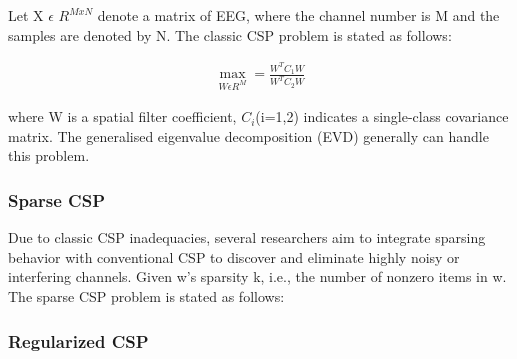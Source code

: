 \documentclass{Configuration_Files/PoliMi3i_thesis}
\begin{document}
Let X $\epsilon$ $R^{M x N}$ denote a matrix of EEG, where the channel number is M and the samples are denoted by N. The classic CSP problem is stated as follows:

\begin{align}
	\max_{W \epsilon R^{M}} = \frac{W^{T} C_1 W}{W^{T} C_2 W}
	\label{eq:CSP1}
\end{align}

where W is a spatial filter coefficient, $C_{i}$(i=1,2) indicates a single-class covariance matrix. The generalised eigenvalue decomposition (EVD) generally can handle this problem. \cite{abdullahEEGChannelSelection2022}

\subsubsection{Sparse CSP}

Due to classic CSP inadequacies, several researchers aim to integrate sparsing behavior with conventional CSP to discover and eliminate highly noisy or interfering channels. Given w’s sparsity k, i.e., the number of nonzero items in w. The sparse CSP problem is stated as follows:

\subsubsection{Regularized CSP}


\end{document}
